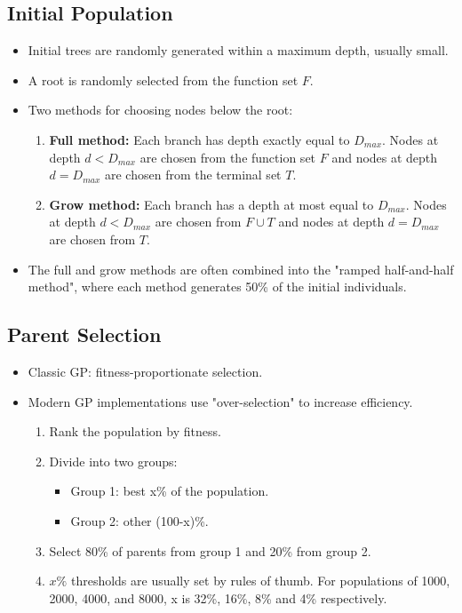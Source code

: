 \subsection*{Initial Population}
\begin{itemize}
    \item  Initial trees are randomly generated within a maximum depth, usually small.
    \item A root is randomly selected from the function set $F$.
    \item Two methods for choosing nodes below the root:
        \begin{enumerate}
            \item \textbf{Full method:} Each branch has depth exactly equal to $D_{max}$. Nodes at depth $d < D_{max}$ are chosen from the function set $F$ and nodes at depth $d = D_{max}$ are chosen from the terminal set $T$.
            \item \textbf{Grow method:} Each branch has a depth at most equal to $D_{max}$. Nodes at depth $d < D_{max}$ are chosen from $F \cup T$ and nodes at depth $d = D_{max}$ are chosen from $T$.
        \end{enumerate}
      \item The full and grow methods are often combined into the "ramped half-and-half method", where each method generates 50\% of the initial individuals.
\end{itemize}

\subsection*{Parent Selection}
\begin{itemize}
    \item  Classic GP: fitness-proportionate selection.
    \item  Modern GP implementations use "over-selection" to increase efficiency.
        \begin{enumerate}
            \item Rank the population by fitness.
             \item Divide into two groups:
                \begin{itemize}
                    \item Group 1: best x\% of the population.
                    \item Group 2: other (100-x)\%.
                 \end{itemize}
            \item Select 80\% of parents from group 1 and 20\% from group 2.
            \item $x\%$ thresholds are usually set by rules of thumb. For populations of 1000, 2000, 4000, and 8000, x is 32\%, 16\%, 8\% and 4\% respectively.
        \end{enumerate}
\end{itemize}

